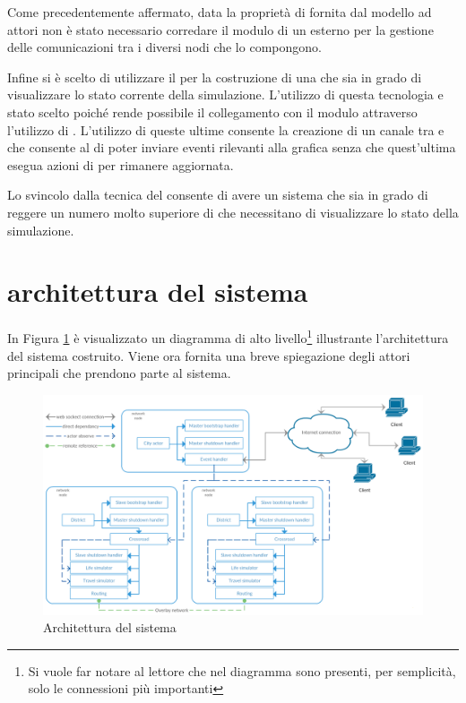 Come precedentemente affermato, data la proprietà di  fornita dal modello ad attori non è stato necessario corredare il modulo  di un  esterno per la gestione delle comunicazioni tra i diversi nodi che lo compongono.

Infine si è scelto di utilizzare il  per la costruzione di una  che sia in grado di visualizzare lo stato corrente della simulazione. L'utilizzo di questa tecnologia e stato scelto poiché rende possibile il collegamento con il modulo  attraverso l'utilizzo di . L'utilizzo di queste ultime consente la creazione di un canale  tra  e  che consente al   di poter inviare eventi rilevanti alla grafica senza che quest'ultima esegua azioni di  per rimanere aggiornata.

Lo svincolo dalla tecnica del  consente di avere un sistema che sia in grado di reggere un numero molto superiore di  che necessitano di visualizzare lo stato della simulazione.

\section*{architettura del sistema}
\label{soluzione-proposta-architettura}
In Figura \ref{soluzione-proposta-architettura-immagine} è visualizzato un diagramma di alto livello\footnote{Si vuole far notare al lettore che nel diagramma sono presenti, per semplicità, solo le connessioni più importanti} illustrante l'architettura del sistema costruito. Viene ora fornita una breve spiegazione degli attori principali che prendono parte al sistema.

\begin{figure}[h!]
\centering
\includegraphics[scale=0.25]{images/solution/architecture.png}
\caption{Architettura del sistema}
\label{soluzione-proposta-architettura-immagine}
\end{figure}

